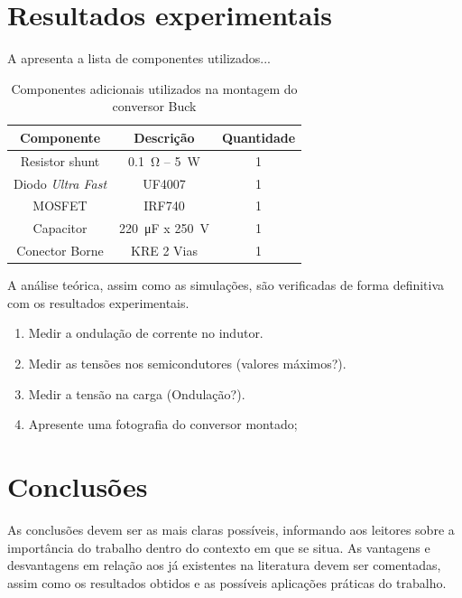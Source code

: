 \section{Resultados experimentais}


A  apresenta a lista de componentes utilizados...

\begin{table}[!ht]
	\centering
	\caption{Componentes adicionais utilizados na montagem do conversor Buck}
	\label{tab:componentesBuck}
	\begin{tabular}{@{}ccc@{}}
		\toprule
		\textbf{Componente} & \textbf{Descrição} & \textbf{Quantidade} \\ \midrule
		Resistor shunt      & \SI{0.1}{\ohm} -- \SI{5}{\W}             & 1                   \\
		Diodo \emph{Ultra Fast}           & UF4007             & 1                   \\
					MOSFET              & IRF740             & 1                   \\
		Capacitor           & \SI{220}{\micro\farad} x \SI{250}{\V}      & 1                   \\
		Conector Borne      &  KRE 2 Vias    & 1                   \\
		\bottomrule
	\end{tabular}
\end{table}


A análise teórica, assim como as simulações, são verificadas de forma definitiva com os resultados experimentais.
\begin{enumerate}									
	\item  Medir a ondulação de corrente no indutor.
	\item  Medir as tensões nos semicondutores (valores máximos?).
	\item Medir a tensão na carga (Ondulação?).
	\item  Apresente uma fotografia do conversor montado;
\end{enumerate}

\section{Conclusões} 


As conclusões devem ser as mais claras possíveis, informando aos leitores sobre a importância do trabalho dentro do contexto em que se situa. As vantagens e desvantagens em relação aos já existentes na literatura devem ser comentadas, assim como os resultados obtidos e as possíveis aplicações práticas do trabalho.





\balance


